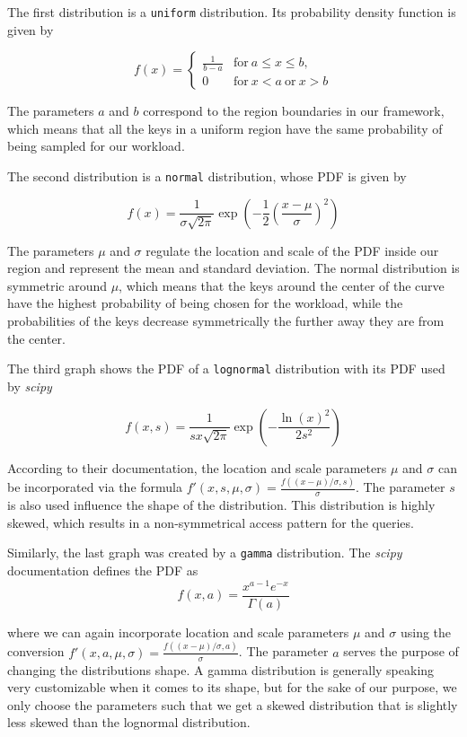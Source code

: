 The first distribution is a \verb|uniform| distribution. Its probability density function is given by

$$
f(x)=\begin{cases}
  \frac{1}{b - a} & \mathrm{for}\ a \le x \le b, \\[8pt]
  0 & \mathrm{for}\ x<a\ \mathrm{or}\ x>b
  \end{cases}
$$

\noindent The parameters $a$ and $b$ correspond to the region boundaries in our framework, which means that all the keys in a uniform region have the same probability of being sampled for our workload.

\noindent The second distribution is a \verb|normal| distribution, whose PDF is given by

$$
f(x) = \frac{1}{\sigma \sqrt{2 \pi}} \exp{(-\frac{1}{2}(\frac{x - \mu}{\sigma})^2)}
$$

\noindent The parameters $\mu$ and $\sigma$ regulate the location and scale of the PDF inside our region and represent the mean and standard deviation. The normal distribution is symmetric around $\mu$, which means that the keys around the center of the curve have the highest probability of being chosen for the workload, while the probabilities of the keys decrease symmetrically the further away they are from the center.

\noindent The third graph shows the PDF of a \verb|lognormal| distribution with its PDF used by \textit{scipy}

$$
f(x, s) = \frac{1}{s x \sqrt{2 \pi}} \exp{(-\frac{\ln{(x)}^2}{2 s^2})}
$$

\noindent According to their documentation, the location and scale parameters $\mu$ and $\sigma$ can be incorporated via the formula $f'(x, s, \mu, \sigma) = \frac{f((x - \mu)/ \sigma, s)}{\sigma}$. The parameter $s$ is also used influence the shape of the distribution. This distribution is highly skewed, which results in a non-symmetrical access pattern for the queries. 

\noindent Similarly, the last graph was created by a \verb|gamma| distribution. The \textit{scipy} documentation defines the PDF as 
$$
f(x, a) = \frac{x^{a - 1} e^{-x}}{\Gamma(a)}
$$

\noindent where we can again incorporate location and scale parameters $\mu$ and $\sigma$ using the conversion $f'(x, a, \mu, \sigma) = \frac{f((x - \mu)/ \sigma, a)}{\sigma}$. The parameter $a$ serves the purpose of changing the distributions shape. A gamma distribution is generally speaking very customizable when it comes to its shape, but for the sake of our purpose, we only choose the parameters such that we get a skewed distribution that is slightly less skewed than the lognormal distribution.

